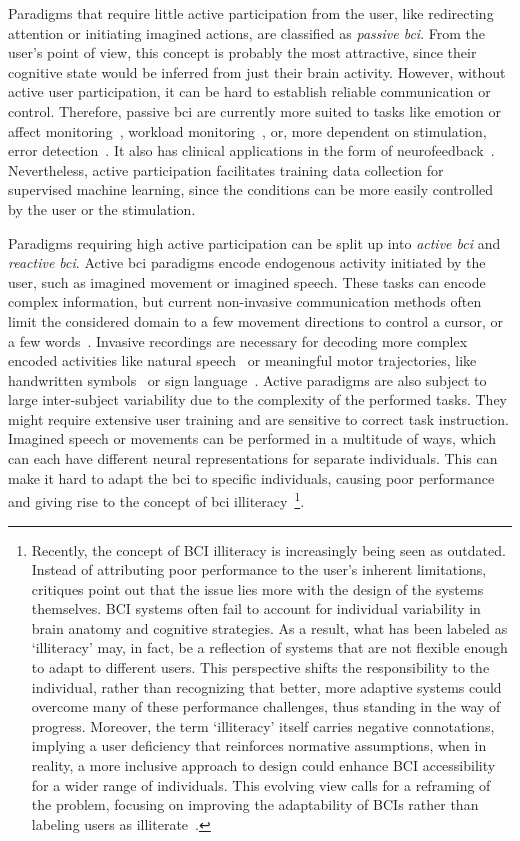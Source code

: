 Paradigms that require little active participation from the user, like redirecting
attention or initiating imagined actions, are classified as \emph{passive \ac{bci}}.
From the user's point of view, this concept is probably the most attractive, since their
cognitive state would be inferred from just their brain activity.
However, without active user participation, it can be hard to establish reliable
communication or control.
Therefore, passive \ac{bci} are currently more suited to tasks like emotion or affect
monitoring~\cite{Torres2020,Libert2019, Muehl2014}, workload monitoring~\cite{Zanetti2021},
or, more dependent on stimulation, error detection~\cite{SiMohammed2020}.
It also has clinical applications in the form of neurofeedback~\cite{Hammond2011}.
Nevertheless, active participation facilitates training data collection for supervised
machine learning, since the conditions can be more easily controlled by the user or the
stimulation.

Paradigms requiring high active participation can be split up into \emph{active
\ac{bci}} and \emph{reactive \ac{bci}}.
Active \ac{bci} paradigms encode endogenous activity initiated by the user, such as
imagined movement or imagined speech.
These tasks can encode complex information, but current non-invasive communication
methods often limit the considered domain to a few movement directions to control a
cursor, or a few words~\cite{Panachakel2021}.
Invasive recordings are necessary for decoding more complex encoded activities like
natural speech~\cite{Metzger2023} or meaningful motor trajectories, like handwritten
symbols~\cite{Willett2021} or sign language~\cite{Branco2017}.
Active paradigms are also subject to large inter-subject variability due to the
complexity of the performed tasks.
They might require extensive user training and are sensitive to correct task
instruction.
Imagined speech or movements can be performed in a multitude of ways, which can each
have different neural representations for separate individuals.
This can make it hard to adapt the \ac{bci} to specific individuals, causing poor
performance and giving rise to the concept of \ac{bci} illiteracy~\cite{Allison2010}\footnote{%
Recently, the concept of BCI illiteracy is increasingly being seen as outdated.
Instead of attributing poor performance to the user's inherent limitations, critiques
point out that the issue lies more with the design of the systems themselves.
BCI systems often fail to account for individual variability in brain anatomy and
cognitive strategies.
As a result, what has been labeled as `illiteracy' may, in fact, be a reflection of
systems that are not flexible enough to adapt to different users.
This perspective shifts the responsibility to the individual, rather than recognizing
that better, more adaptive systems could overcome many of these performance challenges,
thus standing in the way of progress.
Moreover, the term `illiteracy' itself carries negative connotations, implying a user
deficiency that reinforces normative assumptions, when in reality, a more inclusive
approach to design could enhance BCI accessibility for a wider range of
individuals.
This evolving view calls for a reframing of the problem, focusing on improving the
adaptability of BCIs rather than labeling users as illiterate~\cite{Becker2022,Thompson2019}.}.

